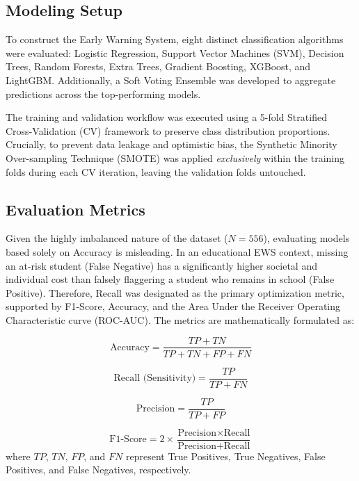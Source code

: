 \documentclass[12pt,journal,compsoc]{IEEEtran}
\begin{document}
\subsection{Modeling Setup}
\label{subsec:modeling_setup}
To construct the Early Warning System, eight distinct classification algorithms were evaluated: Logistic Regression, Support Vector Machines (SVM), Decision Trees, Random Forests, Extra Trees, Gradient Boosting, XGBoost, and LightGBM. Additionally, a Soft Voting Ensemble was developed to aggregate predictions across the top-performing models.

The training and validation workflow was executed using a 5-fold Stratified Cross-Validation (CV) framework to preserve class distribution proportions. Crucially, to prevent data leakage and optimistic bias, the Synthetic Minority Over-sampling Technique (SMOTE) was applied \textit{exclusively} within the training folds during each CV iteration, leaving the validation folds untouched. 

\subsection{Evaluation Metrics}
\label{subsec:evaluation_metrics}
Given the highly imbalanced nature of the dataset ($N=556$), evaluating models based solely on Accuracy is misleading. In an educational EWS context, missing an at-risk student (False Negative) has a significantly higher societal and individual cost than falsely flaggering a student who remains in school (False Positive). Therefore, Recall was designated as the primary optimization metric, supported by F1-Score, Accuracy, and the Area Under the Receiver Operating Characteristic curve (ROC-AUC). The metrics are mathematically formulated as:

\begin{equation}
    \text{Accuracy} = \frac{TP + TN}{TP + TN + FP + FN}
\end{equation}

\begin{equation}
    \text{Recall (Sensitivity)} = \frac{TP}{TP + FN}
\end{equation}

\begin{equation}
    \text{Precision} = \frac{TP}{TP + FP}
\end{equation}

\begin{equation}
    \text{F1-Score} = 2 \times \frac{\text{Precision} \times \text{Recall}}{\text{Precision} + \text{Recall}}
\end{equation}
where $TP$, $TN$, $FP$, and $FN$ represent True Positives, True Negatives, False Positives, and False Negatives, respectively.
\end{document}
